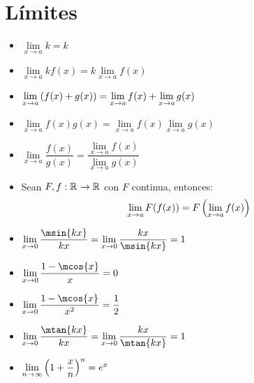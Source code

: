 \section{Límites}
\begin{itemize}
	\item $\lim\limits_{x\to a}k = k$
	\item $\lim\limits_{x\to a}kf(x) = k\lim\limits_{x\to a}f(x)$
	\item $\lim\limits_{x\to a}\left( f(x) + g(x) \right) =\lim\limits_{x\to a}f(x) +\lim\limits_{x\to a}g(x)$
	\item $\lim\limits_{x\to a}f(x)g(x) =\lim\limits_{x\to a}f(x)\lim\limits_{x\to a}g(x)$
	\item $\lim\limits_{x\to a}\dfrac{f(x)}{g(x)} =\dfrac{\lim\limits_{x\to a}f(x)}{\lim\limits_{x\to a}g(x)}$
	\item Sean $F, f:\mathbb{R}^{}\to\mathbb{R}^{}$ con $F$ continua, entonces:
	\[ \lim\limits_{x\to a}F(f(x)) =F\left( \lim\limits_{x\to a}f(x) \right) \]
	\item $\lim\limits_{x\to 0}\dfrac{\msin{kx}}{kx} =\lim\limits_{x\to 0}\dfrac{kx}{\msin{kx}} = 1$
	\item $\lim\limits_{x\to 0}\dfrac{1 -\mcos{x}}{x} = 0$
	\item $\lim\limits_{x\to 0}\dfrac{1 -\mcos{x}}{x^{2}} =\dfrac{1}{2}$
	\item $\lim\limits_{x\to 0}\dfrac{\mtan{kx}}{kx} =\lim\limits_{x\to 0}\dfrac{kx}{\mtan{kx}} = 1$
	\item $\lim\limits_{n\to\infty}\left( 1 +\dfrac{x}{n} \right)^{n} = e^{x}$
\end{itemize}